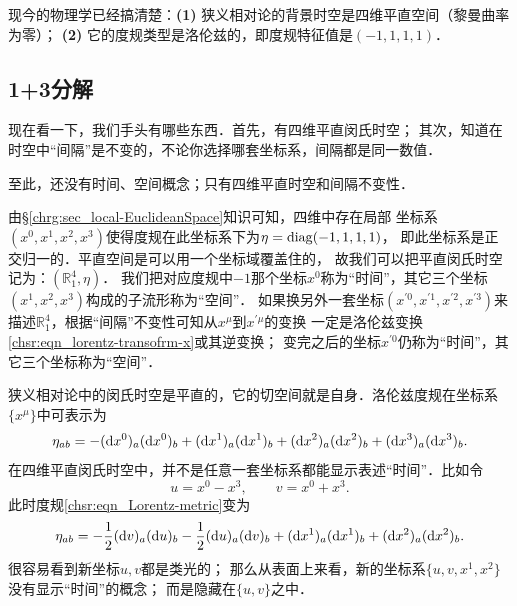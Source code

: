 现今的物理学已经搞清楚：{\bfseries (1)} 狭义相对论的背景时空是四维平直空间（黎曼曲率为零）；
{\bfseries (2)} 它的度规类型是洛伦兹的，即度规特征值是$(-1,1,1,1)$．




\subsection{1+3分解}\label{chsr:sec_1+3decom}
现在看一下，我们手头有哪些东西．首先，有四维平直闵氏时空；
其次，知道在时空中“间隔”是不变的，不论你选择哪套坐标系，间隔都是同一数值．

至此，还没有时间、空间概念；只有四维平直时空和间隔不变性．

由\S\ref{chrg:sec_local-EuclideanSpace}知识可知，四维中存在局部
坐标系$(x^0,x^1, x^2, x^3)$使得度规在此坐标系下为$\eta={\rm diag}(-1,1,1,1)$，
即此坐标系是正交归一的．平直空间是可以用一个坐标域覆盖住的，
故我们可以把平直闵氏时空记为：$(\mathbb{R}^4_1,\eta)$．
我们把对应度规中$-1$那个坐标$x^0$称为“时间”，其它三个坐标$(x^1, x^2, x^3)$构成的子流形称为“空间”．
如果换另外一套坐标$(x^{\prime 0},x^{\prime 1}, x^{\prime 2}, x^{\prime 3})$来
描述$\mathbb{R}^4_1$，根据“间隔”不变性可知从$x^\mu$到$x^{\prime \mu}$的变换
一定是洛伦兹变换\eqref{chsr:eqn_lorentz-transofrm-x}或其逆变换；
变完之后的坐标$x^{\prime 0}$仍称为“时间”，其它三个坐标称为“空间”．


狭义相对论中的闵氏时空是平直的，它的切空间就是自身．洛伦兹度规在坐标系$\{x^\mu\}$中可表示为
\begin{equation}\label{chsr:eqn_Lorentz-metric}
	\eta_{ab} = -({\rm d}x^0)_a ({\rm d}x^0)_b+({\rm d}x^1)_a({\rm d}x^1)_b
	+({\rm d}x^2)_a ({\rm d}x^2)_b+({\rm d}x^3)_a({\rm d}x^3)_b .
\end{equation}
在四维平直闵氏时空中，并不是任意一套坐标系都能显示表述“时间”．比如令
\begin{equation}
	u= x^0 - x^3, \qquad v= x^0 + x^3.
\end{equation}
此时度规\eqref{chsr:eqn_Lorentz-metric}变为
\begin{equation}\label{chsr:eqn_Lorentz-metric-light}
	\eta_{ab} = -\frac{1}{2}({\rm d}v)_a ({\rm d}u)_b
	-\frac{1}{2}({\rm d}u)_a ({\rm d}v)_b
	+({\rm d}x^1)_a({\rm d}x^1)_b +({\rm d}x^2)_a ({\rm d}x^2)_b.
\end{equation}
很容易看到新坐标$u,v$都是类光的；
那么从表面上来看，新的坐标系$\{u,v,x^1,x^2\}$没有显示“时间”的概念；
而是隐藏在$\{u,v\}$之中．








